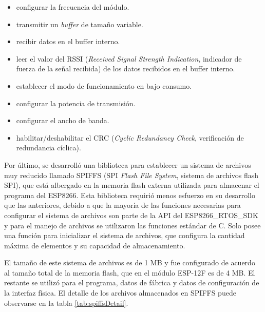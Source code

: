 \begin{itemize}
	\item configurar la frecuencia del módulo.
	\item transmitir un \textit{buffer} de tamaño variable.
	\item recibir datos en el buffer interno.
	\item leer el valor del RSSI (\textit{Received Signal Strength Indication}, indicador de fuerza de la señal recibida) de los datos recibidos en el buffer interno.
	\item establecer el modo de funcionamiento en bajo consumo.
	\item configurar la potencia de transmisión.
	\item configurar el ancho de banda.
	\item habilitar/deshabilitar el CRC (\textit{Cyclic Redundancy Check}, verificación de redundancia cíclica).
\end{itemize}

Por último, se desarrolló una biblioteca para establecer un sistema de archivos muy reducido llamado SPIFFS (SPI \textit{Flash File System}, sistema de archivos flash SPI), que está albergado en la memoria flash externa utilizada para almacenar el programa del ESP8266. Esta biblioteca requirió menos esfuerzo en su desarrollo que las anteriores, debido a que la mayoría de las funciones necesarias para configurar el sistema de archivos son parte de la API del ESP8266\_RTOS\_SDK y para el manejo de archivos se utilizaron las funciones estándar de C. Solo posee una función para inicializar el sistema de archivos, que configura la cantidad máxima de elementos y su capacidad de almacenamiento.

El tamaño de este sistema de archivos es de 1 MB y fue configurado de acuerdo al tamaño total de la memoria flash, que en el módulo ESP-12F es de 4 MB. El restante se utilizó para el programa, datos de fábrica y datos de configuración de la interfaz física. El detalle de los archivos almacenados en SPIFFS puede observarse en la tabla \ref{tab:spiffsDetail}.

